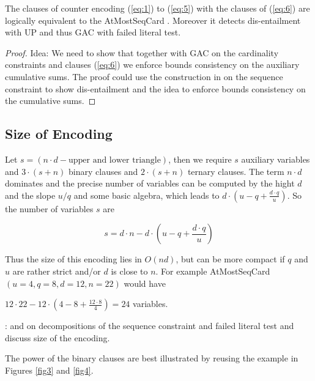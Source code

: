 \documentclass[]{llncs}
\newcommand{\TODO}[1]{ {\color{red}{#1} }}
\newcommand{\AtMostSeqCard}{AtMostSeqCard }
\begin{document}
\begin{theorem}
    The clauses of counter encoding (\ref{eq:1}) to (\ref{eq:5}) with
    the clauses of (\ref{eq:6}) are logically equivalent to the
    \AtMostSeqCard. Moreover it detects dis-entailment with UP and thus
    GAC with failed literal test. 
\end{theorem}


\begin{proof}
    Idea: We need to show that together with GAC on the cardinality
    constraints and clauses (\ref{eq:6}) we enforce bounds consistency
    on the auxiliary cumulative sums. The proof could use the
    construction in \cite{Bacchus07} on the sequence constraint to show
    dis-entailment and the idea \cite{Brand07} to enforce bounds
    consistency on the cumulative sums. 
\end{proof}


\subsection{Size of Encoding} 

Let $s = (n\cdot d-\text{upper and lower triangle})$, then we require $s$
auxiliary variables and $3\cdot (s+n)$ binary clauses and $2\cdot (s+n)$ ternary
clauses. The term $n\cdot d$ dominates and the precise number of
variables can be computed by the hight $d$ and the slope $u/q$ and some
basic algebra, which leads to $d\cdot(u-q+\frac{d \cdot q}{u}) $. So the
number of variables $s$ are

$$ s = d \cdot n - d \cdot(u-q+\frac{d \cdot q}{u}) $$

Thus the size of this encoding lies in $O(nd)$, but can be more compact
if $q$ and $u$ are rather strict and/or $d$ is close to $n$. For example
\AtMostSeqCard$(u=4,q=8,d=12,n=22)$ would have 

$ 12\cdot 22- 12\cdot ( 4-8+\frac{12 \cdot 8}{4}) = 24$ variables. 


\TODO{Give two references here}: \cite{Bacchus07} and \cite{Bessiere09}
on decompositions of the sequence constraint and failed literal test and
discuss size of the encoding. 

The power of the binary clauses are best illustrated by reusing the
example \cite{Siala12} in Figures \ref{fig3} and \ref{fig4}.
\end{document}
